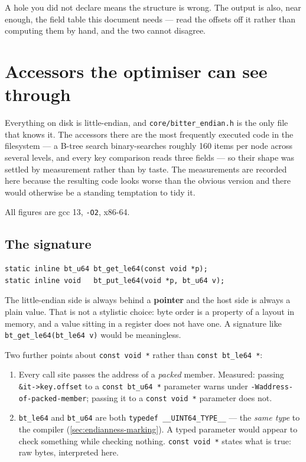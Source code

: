 A hole you did not declare means the structure is wrong. The output is also,
near enough, the field table this document needs --- read the offsets off it
rather than computing them by hand, and the two cannot disagree.

\section{Accessors the optimiser can see through}
\label{sec:endian-accessors}

Everything on disk is little-endian, and \lstinline|core/bitter_endian.h| is
the only file that knows it. The accessors there are the most frequently
executed code in the filesystem --- a B-tree search binary-searches roughly 160
items per node across several levels, and every key comparison reads three
fields --- so their shape was settled by measurement rather than by taste. The
measurements are recorded here because the resulting code looks worse than the
obvious version and there would otherwise be a standing temptation to tidy it.

All figures are gcc 13, \lstinline|-O2|, x86-64.

\subsection{The signature}

\begin{lstlisting}[style=c]
static inline bt_u64 bt_get_le64(const void *p);
static inline void   bt_put_le64(void *p, bt_u64 v);
\end{lstlisting}

The little-endian side is always behind a \textbf{pointer} and the host side is
always a plain value. That is not a stylistic choice: byte order is a property
of a layout in memory, and a value sitting in a register does not have one.
A signature like \lstinline|bt_get_le64(bt_le64 v)| would be meaningless.

Two further points about \lstinline|const void *| rather than
\lstinline|const bt_le64 *|:

\begin{enumerate}
  \item Every call site passes the address of a \emph{packed} member.
    Measured: passing \lstinline|&it->key.offset| to a
    \lstinline|const bt_u64 *| parameter warns under
    \lstinline|-Waddress-of-packed-member|; passing it to a
    \lstinline|const void *| parameter does not.
  \item \lstinline|bt_le64| and \lstinline|bt_u64| are both
    \lstinline|typedef __UINT64_TYPE__| --- the \emph{same type} to the
    compiler (\cref{sec:endianness-marking}). A typed parameter would appear
    to check something while checking nothing. \lstinline|const void *| states
    what is true: raw bytes, interpreted here.
\end{enumerate}

